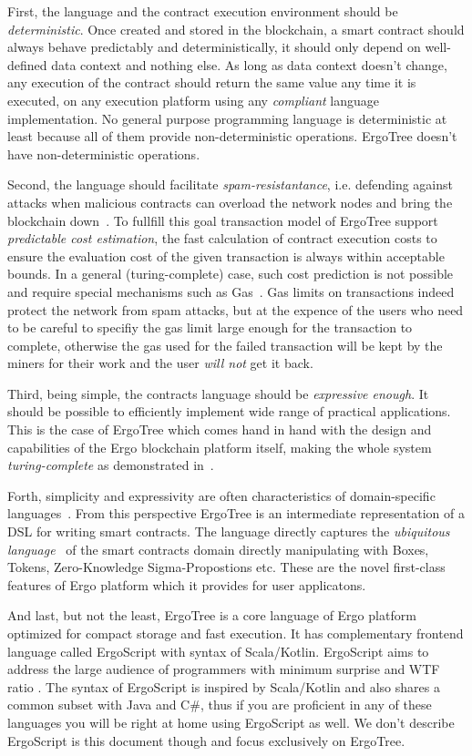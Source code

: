 \documentclass[11pt]{article}
\newcommand{\ASDag}{ErgoTree\xspace}
\begin{document}
First, the language and the contract execution environment should be
\emph{deterministic}. Once created and stored in the blockchain, a smart contract
should always behave predictably and deterministically, it should only depend on
well-defined data context and nothing else. As long as data context doesn't change, any
execution of the contract should return the same value any time it is executed, on any
execution platform using any \emph{compliant} language implementation. No general
purpose programming language is deterministic at least because all of them provide
non-deterministic operations. \ASDag doesn't have non-deterministic operations.

Second, the language should facilitate \emph{spam-resistantance}, i.e. defending
against attacks when malicious contracts can overload the network nodes and bring the
blockchain down~\cite{fivehrs}. To fullfill this goal transaction model of \ASDag support
\emph{predictable cost estimation}, the fast calculation of contract execution costs to
ensure the evaluation cost of the given transaction is always within acceptable bounds.
In a general (turing-complete) case, such cost prediction is not possible and require
special mechanisms such as Gas~\cite{wood2014ethereum}. Gas limits on transactions
indeed protect the network from spam attacks, but at the expence of the users who need to
be careful to specifiy the gas limit large enough for the transaction to complete,
otherwise the gas used for the failed transaction will be kept by the miners for their
work and the user \emph{will not} get it back.

Third, being simple, the contracts language should be \emph{expressive enough}. It
should be possible to efficiently implement wide range of practical applications. This
is the case of \ASDag which comes hand in hand with the design and capabilities of the
Ergo blockchain platform itself, making the whole system \emph{turing-complete} as 
demonstrated in~\cite{CKM18}.

Forth, simplicity and expressivity are often characteristics of domain-specific
languages~\cite{dslbook,HudakDSL}. From this perspective \ASDag is an intermediate
representation of a DSL for writing smart contracts. The language directly captures the
\emph{ubiquitous language}~\cite{UbiqLang} of the smart contracts domain directly
manipulating with Boxes, Tokens, Zero-Knowledge Sigma-Propostions etc.
These are the novel first-class features of Ergo platform which it provides for user
applicatons. 

And last, but not the least, \ASDag is a core language of Ergo platform optimized for
compact storage and fast execution. It has complementary frontend language called
ErgoScript with syntax of Scala/Kotlin. ErgoScript aims to address the large audience
of programmers with minimum surprise and WTF ratio \cite{WTFLang}. The syntax of
ErgoScript is inspired by Scala/Kotlin and also shares a common subset with Java and
C\#, thus if you are proficient in any of these languages you will be right at home
using ErgoScript as well. We don't describe ErgoScript is this document though and
focus exclusively on \ASDag.
\end{document}
